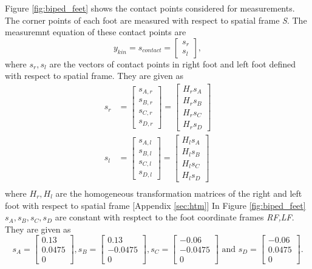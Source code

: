  Figure \ref{fig:biped_feet} shows the contact points considered for measurements. The corner points of each foot are measured with respect to spatial frame \emph{S}. The measuremnt equation of these contact points are
\begin{equation}
    \label{eq:y_kin}
    y_{kin} = s_{contact} = \begin{bmatrix}s_{r}\\ s_{l}\end{bmatrix},
\end{equation} where
$s_{r},s_{l}$ are the vectors of contact points in right foot and left foot defined with respect to spatial frame. They are given as
\begin{equation}
	\label{eq:y_cnt}
    \begin{split}
    s_{r} &= \begin{bmatrix} s_{A,r}\\ s_{B,r}\\ s_{C,r}\\ s_{D,r}\end{bmatrix}= \begin{bmatrix} {H}_{r}s_{A}\\  {H}_{r}s_{B}\\  {H}_{r}s_{C}\\  {H}_{r}s_{D}\end{bmatrix} \\
    s_{l} &= \begin{bmatrix} s_{A,l}\\ s_{B,l}\\ s_{C,l}\\ s_{D,l}\end{bmatrix}= \begin{bmatrix} {H}_{l}s_{A}\\  {H}_{l}s_{B}\\  {H}_{l}s_{C}\\  {H}_{l}s_{D}\end{bmatrix} \\
    \end{split}
\end{equation}
where ${H}_{r},{H}_{l}$ are the homogeneous transformation matrices of the right and left foot with respect to spatial frame [Appendix \ref{sec:htm}]
 In Figure \ref{fig:biped_feet} $s_A,s_B,s_C,s_D$ are constant with resptect to the foot coordinate frames \emph{RF,LF}. They are given as 
 $$ s_A = \begin{bmatrix} 0.13 \\ 0.0475 \\ 0 \end{bmatrix} , 
    s_B = \begin{bmatrix} 0.13 \\ -0.0475 \\ 0 \end{bmatrix},
    s_C = \begin{bmatrix} -0.06 \\ -0.0475 \\ 0 \end{bmatrix} \text{ and }
    s_D = \begin{bmatrix} -0.06 \\ 0.0475 \\ 0 \end{bmatrix}.$$

